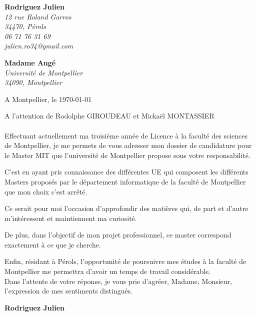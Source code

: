 \documentclass[11pt]{letter}
\begin{document}
 \sffamily
 \hfill
 \begin{flushleft}
 {\bfseries Rodriguez Julien}\\[.35ex]
 \small\itshape
 12 rue Roland Garros\\
 34470, Pérols\\[.35ex]
 06 71 76 31 69\\
 julien.ro34@gmail.com
 \end{flushleft}
 \begin{flushright}
 {\bfseries Madame Augé}\\[.35ex]
 \small\itshape
 Université de Montpellier\\
 34090, Montpellier
 \end{flushright}
 \hfill
 \begin{flushright}
 A Montpellier, le \today \\
 
 \end{flushright}
A l'attention de Rodolphe GIROUDEAU et Mickaël MONTASSIER\\ \\
Effectuant actuellement ma troisième année de Licence à la faculté des sciences de Montpellier, je me permets de vous adresser mon dossier de candidature pour le Master MIT que l’université de Montpellier propose sous votre responsabilité.

C'est en ayant pris connaissance des différentes UE qui composent les différents Masters proposés par le département informatique de la faculté de Montpellier que mon choix c'est arrêté. 

Ce serait pour moi l'occasion d'approfondir des matières qui, de part et d'autre m'intéressent et maintiennent ma curiosité. 

De plus, dans l'objectif de mon projet professionnel, ce master correspond exactement à ce que je cherche. 

Enfin, résidant à Pérols, l'opportunité de poursuivre mes études à la faculté  de Montpellier me permettra d'avoir un temps de travail considérable. 
\\
Dans l'attente de votre réponse, je vous prie d'agréer, Madame, Monsieur, l'expression de mes sentiments distingués.
\\
 \begin{center}
 {\bfseries Rodriguez Julien}\\
 \end{center}
 \vfill
 
\end{document}
